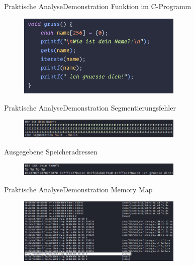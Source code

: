 \begin{frame}{Praktische Analyse}{Demonstration}
    \indent\hspace{5.5em}\large{Funktion  im C-Programm}
    \begin{figure}[h]
        \centering
        \includegraphics[width=0.7\textwidth,height=0.75\textheight,keepaspectratio]{images/gruss.png}
    \end{figure}
\end{frame}

\begin{frame}{Praktische Analyse}{Demonstration}
    \indent\hspace{5.5em}\large{Segmentierungsfehler}
    \begin{figure}[h]
        \centering
        \includegraphics[width=0.7\textwidth,height=0.75\textheight,keepaspectratio]{images/segfault.png}
    \end{figure}
    \indent\hspace{5.1em}\large{Ausgegebene Speicheradressen}
    \begin{figure}[h]
        \centering
        \includegraphics[width=0.7\textwidth,height=0.75\textheight,keepaspectratio]{images/adressen.png}
    \end{figure}
\end{frame}

\begin{frame}{Praktische Analyse}{Demonstration}
    \indent\hspace{5.4em}\large{Memory Map}
    \begin{figure}[h]
        \centering
        \includegraphics[width=0.7\textwidth,height=0.75\textheight,keepaspectratio]{images/map.png}
    \end{figure}
\end{frame}

